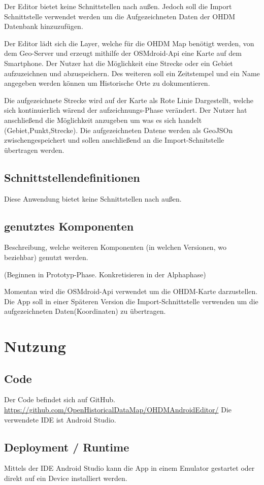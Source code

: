 Der Editor bietet keine Schnittstellen nach außen. Jedoch soll die Import Schnittstelle verwendet werden um die Aufgezeichneten Daten der OHDM Datenbank hinzuzufügen.

Der Editor lädt sich die Layer, welche für die OHDM Map benötigt werden, von dem Geo-Server und erzeugt mithilfe der OSMdroid-Api eine Karte auf dem Smartphone. Der Nutzer hat die Möglichkeit eine Strecke oder ein Gebiet aufzuzeichnen und abzuspeichern. Des weiteren soll ein Zeitstempel und ein Name angegeben werden können um Historische Orte zu dokumentieren.

Die aufgezeichnete Strecke wird auf der Karte als Rote Linie Dargestellt, welche sich kontinuierlich wärend der aufzeichnungs-Phase verändert. Der Nutzer hat anschließend die Möglichkeit anzugeben um was es sich handelt (Gebiet,Punkt,Strecke). Die aufgezeichneten Datene werden als GeoJSOn zwischengespeichert und sollen anschließend an die Import-Schnitstelle übertragen werden.

\subsection{Schnittstellendefinitionen}

Diese Anwendung bietet keine Schnittstellen nach außen.

\subsection{genutztes Komponenten}
Beschreibung, welche weiteren Komponenten (in welchen Versionen, wo beziehbar) genutzt werden.

(Beginnen in Prototyp-Phase. Konkretisieren in der Alphaphase)

Momentan wird die OSMdroid-Api verwendet um die OHDM-Karte darzustellen.
Die App soll in einer Späteren Version die Import-Schnittstelle verwenden um die aufgezeichneten Daten(Koordinaten) zu übertragen.

\section{Nutzung}
\subsection{Code}
Der Code befindet sich auf GitHub. \url{https://github.com/OpenHistoricalDataMap/OHDMAndroidEditor/}
Die verwendete IDE ist Android Studio.

\subsection{Deployment / Runtime}
Mittels der IDE Android Studio kann die App in einem Emulator gestartet oder direkt auf ein Device installiert werden.

